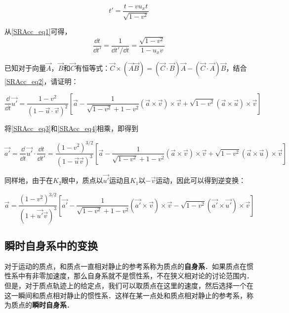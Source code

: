 \begin{equation}\label{SRAcc_eq1}
t'=\frac{t-vu_xt}{\sqrt{1-v^2}}
\end{equation}

从\autoref{SRAcc_eq1}可得，
\begin{equation}\label{SRAcc_eq3}
\frac{\dd t}{\dd t'}=\frac{1}{\dd t'/\dd t}=\frac{\sqrt{1-v^2}}{1-u_xv}
\end{equation}

\begin{exercise}{}

已知对于向量$\vec{A}$，$\vec{B}$和$\vec{C}$有恒等式：$\vec{C}\times(\vec{A}\vec{B})=(\vec{C}\cdot\vec{B})\vec{A}-(\vec{C}\cdot\vec{A})\vec{B}$，结合\autoref{SRAcc_eq2}，请证明：

\begin{equation}\label{SRAcc_eq4}

\frac{\dd}{\dd t}\vec{u'}=\frac{1-v^2}{(1-\vec{u}\cdot\vec{v})^2}[\vec{a}-\frac{1}{\sqrt{1-v^2}+1-v^2}(\vec{a}\times\vec{v})\times\vec{v}+\sqrt{1-v^2}(\vec{a}\times\vec{u})\times\vec{v}]

\end{equation}

\end{exercise}

将\autoref{SRAcc_eq3}和\autoref{SRAcc_eq4}相乘，即得到

\begin{equation}

\vec{a'}=\frac{\dd}{\dd t}\vec{u'}\cdot\frac{\dd t}{\dd t'}=\frac{(1-v^2)^{3/2}}{(1-\vec{u}\vec{v})^3}[\vec{a}-\frac{1}{\sqrt{1-v^2}+1-v^2}(\vec{a}\times\vec{v})\times\vec{v}+\sqrt{1-v^2}(\vec{a}\times\vec{u})\times\vec{v}]

\end{equation}

同样地，由于在$K_2$眼中，质点以$\vec{u'}$运动且$K_1$以$-\vec{v}$运动，因此可以得到逆变换：

\begin{equation}

\vec{a}=\frac{(1-v^2)^{3/2}}{(1+\vec{u'}\vec{v})^3}[\vec{a'}-\frac{1}{\sqrt{1-v^2}+1-v^2}(\vec{a'}\times\vec{v})\times\vec{v}-\sqrt{1-v^2}(\vec{a'}\times\vec{u'})\times\vec{v}]

\end{equation}


\subsection{瞬时自身系中的变换}

对于运动的质点，和质点一直相对静止的参考系称为质点的\textbf{自身系}．如果质点在惯性系中有非零加速度，那么自身系就不是惯性系，不在狭义相对论的讨论范围内．但是，对于质点轨迹上的给定点，我们可以取质点在这里的速度，然后选择一个在这一瞬间和质点相对静止的惯性系．这样在某一点处和质点相对静止的参考系，称为质点的\textbf{瞬时自身系}．


